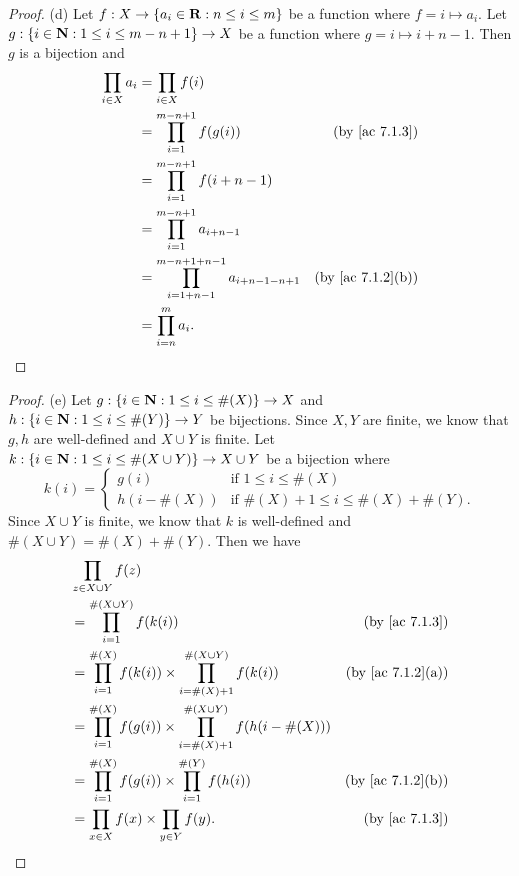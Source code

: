 \begin{proof}{(d)}
  Let \(f : X \to \{a_i \in \mathbf{R} : n \leq i \leq m\}\) be a function where \(f = i \mapsto a_i\).
  Let \(g : \{i \in \mathbf{N} : 1 \leq i \leq m - n + 1\} \to X\) be a function where \(g = i \mapsto i + n - 1\).
  Then \(g\) is a bijection and
  \begin{align*}
    \prod_{i \in X} a_i & = \prod_{i \in X} f(i)                                                                             \\
                        & = \prod_{i = 1}^{m - n + 1} f(g(i))                               & \text{(by \cref{ac 7.1.3})}    \\
                        & = \prod_{i = 1}^{m - n + 1} f(i + n - 1)                                                           \\
                        & = \prod_{i = 1}^{m - n + 1} a_{i + n - 1}                                                          \\
                        & = \prod_{i = 1 + n - 1}^{m - n + 1 + n - 1} a_{i + n - 1 - n + 1} & \text{(by \cref{ac 7.1.2}(b))} \\
                        & = \prod_{i = n}^m a_i.
  \end{align*}
\end{proof}

\begin{proof}{(e)}
  Let \(g : \{i \in \mathbf{N} : 1 \leq i \leq \#(X)\} \to X\) and \(h : \{i \in \mathbf{N} : 1 \leq i \leq \#(Y)\} \to Y\) be bijections.
  Since \(X, Y\) are finite, we know that \(g, h\) are well-defined and \(X \cup Y\) is finite.
  Let \(k : \{i \in \mathbf{N} : 1 \leq i \leq \#(X \cup Y)\} \to X \cup Y\) be a bijection where
  \[
    k(i) = \begin{cases}
      g(i)         & \text{if } 1 \leq i \leq \#(X)                  \\
      h(i - \#(X)) & \text{if } \#(X) + 1 \leq i \leq \#(X) + \#(Y).
    \end{cases}
  \]
  Since \(X \cup Y\) is finite, we know that \(k\) is well-defined and \(\#(X \cup Y) = \#(X) + \#(Y)\).
  Then we have
  \begin{align*}
     & \prod_{z \in X \cup Y} f(z)                                                                                                  \\
     & = \prod_{i = 1}^{\#(X \cup Y)} f(k(i))                                                      & \text{(by \cref{ac 7.1.3})}    \\
     & = \prod_{i = 1}^{\#(X)} f(k(i)) \times \prod_{i = \#(X) + 1}^{\#(X \cup Y)} f(k(i))         & \text{(by \cref{ac 7.1.2}(a))} \\
     & = \prod_{i = 1}^{\#(X)} f(g(i)) \times \prod_{i = \#(X) + 1}^{\#(X \cup Y)} f(h(i - \#(X)))                                  \\
     & = \prod_{i = 1}^{\#(X)} f(g(i)) \times \prod_{i = 1}^{\#(Y)} f(h(i))                        & \text{(by \cref{ac 7.1.2}(b))} \\
     & = \prod_{x \in X} f(x) \times \prod_{y \in Y} f(y).                                         & \text{(by \cref{ac 7.1.3})}
  \end{align*}
\end{proof}

